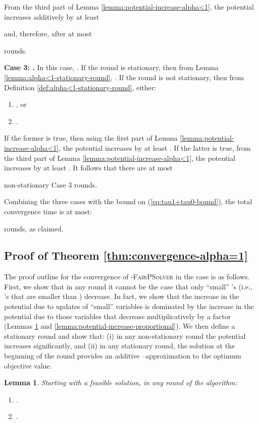 \documentclass[11pt]{article}
\makeatletter
\newtheorem{lemma}[theorem]{Lemma}
\newenvironment{proofof}[1]{\par
  \pushQED{\qed}\normalfont \topsep3\p@\relax
  \trivlist
  \item[\hskip\labelsep
        \bfseries
    Proof of #1\@addpunct{.}]\ignorespaces
}{\popQED\endtrivlist\@endpefalse
}
\makeatother
\begin{document}
\begin{proofof}{Theorem \ref{thm:convergence-alpha<1}}
From the third part of Lemma \ref{lemma:potential-increase-alpha<1}, the potential increases additively by at least 

and, therefore,  after at most

rounds.

\noindent\textbf{Case 3: .} In this case, . If the round is stationary, then from Lemma \ref{lemma:alpha<1-stationary-round}, . If the round is not stationary, then from Definition \ref{def:alpha<1-stationary-round}, either:
\begin{enumerate}
\item , or
\item .
\end{enumerate}
If the former is true, then using the first part of Lemma \ref{lemma:potential-increase-alpha<1}, the potential increases by at least . If the latter is true, from the third part of Lemma \ref{lemma:potential-increase-alpha<1}, the potential increases by at least .
It follows that there are at most 

non-stationary Case 3 rounds.

Combining the three cases with the bound on  (\ref{eq:tau1+tau0-bound}), the total convergence time is at most:

rounds, as claimed.
\end{proofof}


\subsection{Proof of Theorem \ref{thm:convergence-alpha=1}}\label{section:alpha=1}

The proof outline for the convergence of \textsc{-FairPSolver} in the  case is as follows. First, we show that in any round it cannot be the case that only ``small'' 's (i.e., 's that are smaller than ) decrease. In fact, we show that the increase in the potential due to updates of ``small'' variables is dominated by the increase in the potential due to those variables that decrease multiplicatively by a factor  (Lemmas \ref{lemma:mul-increase-prop} and \ref{lemma:potential-increase-proportional}). We then define a stationary round and show that: (i) in any non-stationary round the potential increases significantly, and (ii) in any stationary round, the solution  at the beginning of the round provides an additive --approximation to the optimum objective value.  


\begin{lemma}\label{lemma:mul-increase-prop}
Starting with a feasible solution, in any round of the algorithm: 
\begin{enumerate}
\item .
\item .
\end{enumerate}
\end{lemma}
\end{document}

